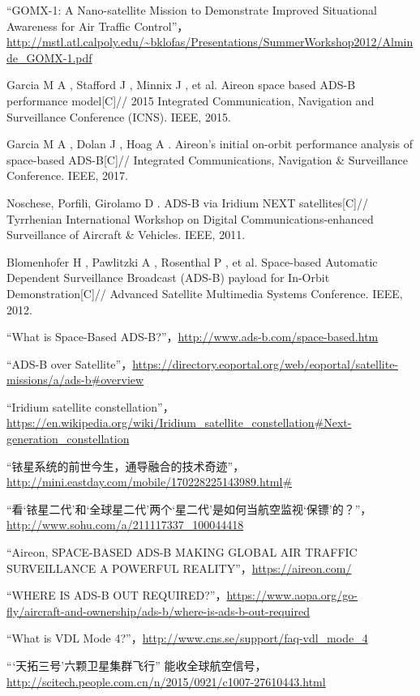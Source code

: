\begin{thebibliography}{99}
“GOMX-1: A Nano-satellite Mission to Demonstrate Improved Situational Awareness for Air Traffic Control”，\url{http://mstl.atl.calpoly.edu/~bklofas/Presentations/SummerWorkshop2012/Alminde_GOMX-1.pdf}

Garcia M A , Stafford J , Minnix J , et al. Aireon space based ADS-B performance model[C]// 2015 Integrated Communication, Navigation and Surveillance Conference (ICNS). IEEE, 2015.

Garcia M A , Dolan J , Hoag A . Aireon's initial on-orbit performance analysis of space-based ADS-B[C]// Integrated Communications, Navigation \& Surveillance Conference. IEEE, 2017.

Noschese, Porfili, Girolamo D . ADS-B via Iridium NEXT satellites[C]// Tyrrhenian International Workshop on Digital Communications-enhanced Surveillance of Aircraft \& Vehicles. IEEE, 2011.

Blomenhofer H , Pawlitzki A , Rosenthal P , et al. Space-based Automatic Dependent Surveillance Broadcast (ADS-B) payload for In-Orbit Demonstration[C]// Advanced Satellite Multimedia Systems Conference. IEEE, 2012.


“What is Space-Based ADS-B?”，\url{http://www.ads-b.com/space-based.htm}

“ADS-B over Satellite”，\url{https://directory.eoportal.org/web/eoportal/satellite-missions/a/ads-b#overview}

“Iridium satellite constellation”，\url{https://en.wikipedia.org/wiki/Iridium_satellite_constellation#Next-generation_constellation}

“铱星系统的前世今生，通导融合的技术奇迹”，\url{http://mini.eastday.com/mobile/170228225143989.html#}

“看‘铱星二代’和‘全球星二代’两个‘星二代’是如何当航空监视‘保镖’的？”，\url{http://www.sohu.com/a/211117337_100044418}

“Aireon, SPACE-BASED ADS-B MAKING GLOBAL AIR TRAFFIC SURVEILLANCE A POWERFUL REALITY”，\url{https://aireon.com/}

“WHERE IS ADS-B OUT REQUIRED?”，\url{https://www.aopa.org/go-fly/aircraft-and-ownership/ads-b/where-is-ads-b-out-required}

“What is VDL Mode 4?”，\url{http://www.cns.se/support/faq-vdl_mode_4}

“‘天拓三号’六颗卫星集群飞行” 能收全球航空信号，\url{http://scitech.people.com.cn/n/2015/0921/c1007-27610443.html}


\end{thebibliography}
